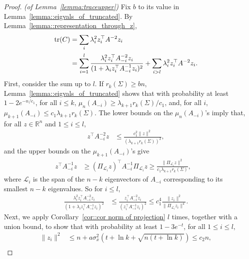\documentclass[11pt,notitlepage]{article}
\newcommand\Ls {\mathscr{L}}
\newcommand\R {\mathbb{R}}
\newcommand\tr {\ensuremath{\operatorname{\mathrm{tr}}}}
\begin{document}
\begin{proof}{\em (of Lemma~\ref{lemma:traceupper})}
    Fix $b$ to its value in Lemma~\ref{lemma::eigvals_of_truncated}.
    By Lemma~\ref{lemma::representation_through_z},
    \begin{align}
      \tr(C)
          &= \sum_{i} \lambda_i^2 z_i^\top A^{-2}z_i \notag\\
          &= \sum_{i = 1}^l\frac{\lambda_i^2 z_i^\top  A_{-i}^{-2}z_i}
            {(1 + \lambda_i z_i^\top A_{-i}^{-1}z_i)^2} +
            \sum_{i >l}\lambda_i^2 z_i^\top A^{-2}z_i.
                    \label{eqn:trCupperterms}
    \end{align}
    First, consider the sum up to $l$.
    If $r_k(\Sigma)\ge bn$,
    Lemma~\ref{lemma::eigvals_of_truncated} shows
    that with probability at least 
$1-2e^{-n/{c_1}}$,
    for all $i\le k$, $\mu_{n}(A_{-i})\ge \lambda_{k+1}r_k(\Sigma)/c_1$,
    and, for all $i$, $\mu_{k+1}(A_{-i})\le c_1\lambda_{k+1}r_k(\Sigma)$.
    The lower bounds on the $\mu_{n}(A_{-i})$'s imply that,
    for all $z \in \R^n$ and $1\le i \leq l$,
      \begin{align*}
        z^\top A_{-i}^{-2} z
          &\leq
          \frac{c_1^2\|z\|^2}{\left(\lambda_{k+1}r_k(\Sigma)\right)^2},
      \end{align*}
    and the upper bounds on the $\mu_{k+1}(A_{-i})$'s give
      \begin{align*}
        z^\top A_{-i}^{-1} z
          &\geq \left(\Pi_{\Ls_i} z\right)^\top
            A_{-i}^{-1} \Pi_{\Ls_i} z 
          \geq\frac{\|\Pi_{\Ls_i} z\|^2}{c_1\lambda_{k+1}r_k(\Sigma)}, &
      \end{align*}
    where 
    $\Ls_i$ is the span of the
    $n-k$ eigenvectors of $A_{-i}$ corresponding to its smallest $n-k$
    eigenvalues. So for $i\le l$,
      \begin{align}
        \frac{\lambda_i^2 z_i^\top  A_{-i}^{-2}z_i}{(1 + \lambda_i z_i^\top A_{-i}^{-1}z_i)^2}
          & \leq \frac{z_i^\top  A_{-i}^{-2}z_i}{(z_i^\top A_{-i}^{-1}z_i)^2}
          \leq c_1^4\frac{\|z_i\|^2}{\|\Pi_{\Ls_i}z_i\|^4}.
        \label{eq::bound_on_Cterm}
      \end{align}
    Next, we apply Corollary~\ref{cor::cor norm of projection} $l$ times, together with a union bound,
    to show that with probability at least $1-3e^{-t}$, for all $1\le i\le l$,
      \begin{align}
        \|z_i\|^2
          & \leq n + a\sigma_x^2(t + \ln k + \sqrt{n(t + \ln k)})\le c_2n, \label{eqn:zinequality1} \\

\end{align}
\end{proof}
\end{document}
